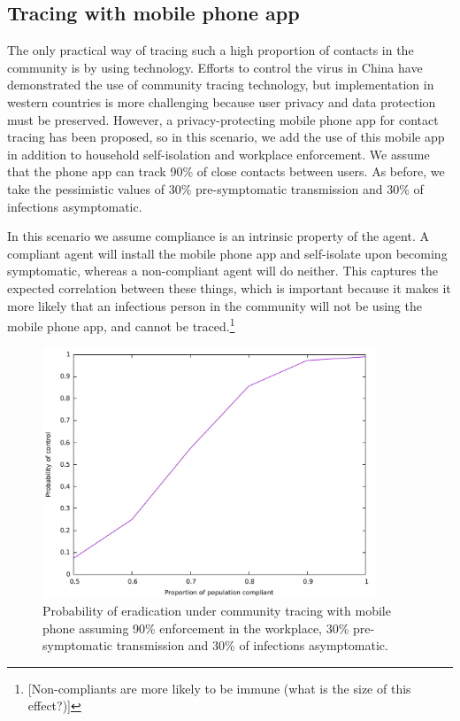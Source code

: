 \documentclass{article}
\begin{document}
\subsection{Tracing with mobile phone app}

The only practical way of tracing such a high proportion of contacts in the community is by using technology. Efforts to control the virus in China have demonstrated the use of community tracing technology, but implementation in western countries is more challenging because user privacy and data protection must be preserved. However, a privacy-protecting mobile phone app for contact tracing has been proposed\cite{tang2020Mobile}, so in this scenario, we add the use of this mobile app in addition to household self-isolation and workplace enforcement. We assume that the phone app can track 90\% of close contacts between users. As before, we take the pessimistic values of 30\% pre-symptomatic transmission and 30\% of infections asymptomatic.

In this scenario we assume compliance is an intrinsic property of the agent. A compliant agent will install the mobile phone app and self-isolate upon becoming symptomatic, whereas a non-compliant agent will do neither. This captures the expected correlation between these things, which is important because it makes it more likely that an infectious person in the community will not be using the mobile phone app, and cannot be traced.\footnote{[Non-compliants are more likely to be immune (what is the size of this effect?)]}


\begin{figure}
\begin{center}
\includegraphics[width = 10cm]{mobileTracing.pdf}
\end{center}
\caption{Probability of eradication under community tracing with mobile phone assuming 90\% enforcement in the workplace, 30\% pre-symptomatic transmission and 30\% of infections asymptomatic.}
\label{mobileTracing}
\end{figure}
\end{document}
